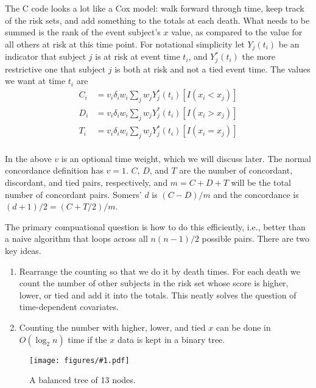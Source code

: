 \documentclass{article}
\newcommand{\myfig}[1]{\texttt{[image: figures/\#1.pdf]}}
\begin{document}
The C code looks a lot like a Cox model: walk forward through time, keep
track of the risk sets, and add something to the totals at each death.
What needs to be summed is the rank of the event subject's $x$ value, as
compared to the value for all others at risk at this time point.
For notational simplicity let $Y_j(t_i)$ be an indicator that subject $j$
is at risk at event time $t_i$, and $Y^*_j(t_i)$ the more restrictive one that
subject $j$ is both at risk and not a tied event time.
The values we want at time $t_i$ are
\begin{align}
  C_i &= v_i \delta_i w_i \sum_j w_j Y^*_j(t_i) \left[I(x_i < x_j) \right]
    \label{C} \\
  D_i &= v_i \delta_i w_i \sum_j w_j Y^*_j(t_i) \left[I(x_i > x_j)\right] 
     \label{D} \\
  T_i &= v_i \delta_i w_i \sum_j w_j Y^*_j(t_i) \left[I(x_i = x_j) \right]
     \label{T}  \\
\end{align} 

In the above $v$ is an optional time weight, which we will discuss later.
The normal concordance definition has $v=1$.
$C$, $D$, and $T$ are the number of concordant, discordant, and tied
pairs, respectively,
and $m= C+D+T$ will be the total number of concordant pairs.
Somers' $d$ is $(C-D)/m$ and the concordance is $(d+1)/2 = (C + T/2)/m$.

The primary compuational question is how to do this efficiently, i.e., better
than a naive algorithm that loops across all $n(n-1)/2$ 
possible pairs.
There are two key ideas.
\begin{enumerate}
\item Rearrange the counting so that we do it by death times.
  For each death we count the number of other subjects in the risk set whose
  score is higher, lower, or tied and add it into the totals.
  This neatly solves the question of time-dependent covariates.
\item Counting the number with higher, lower, and tied $x$ can be done in 
   $O(\log_2 n)$ time if the $x$ data is kept in a binary tree.
\end{enumerate}

\begin{figure}
  \myfig{balance}
  \caption{A balanced tree of 13 nodes.}
  \label{treefig}
\end{figure}
\end{document}

